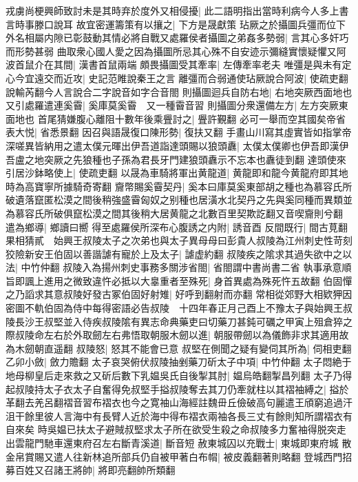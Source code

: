 戎虜尚梗興師致討未是其時弃於度外又相侵擾|{
	此二語明指出當時利病今人多上書言時事滕口說耳}
故宜密運籌策有以攘之|{
	下方是晟獻策}
玷厥之於攝圖兵彊而位下外名相屬内隙已彰鼓動其情必將自戰又處羅侯者攝圖之弟姦多勢弱|{
	言其心多奸巧而形勢甚弱}
曲取衆心國人愛之因為攝圖所忌其心殊不自安迹示彌縫實懷疑懼又阿波首鼠介在其間|{
	漢書首鼠兩端}
頗畏攝圖受其牽率|{
	左傳牽率老夫}
唯彊是與未有定心今宜遠交而近攻|{
	史記范睢說秦王之言}
離彊而合弱通使玷厥說合阿波|{
	使疏吏翻說輸芮翻今人言說合二字說音如字合音閤}
則攝圖迴兵自防右地|{
	右地突厥西面地也}
又引處羅遣連奚霫|{
	奚庫莫奚霫　又一種霫音習}
則攝圖分衆還備左方|{
	左方突厥東面地也}
首尾猜嫌腹心離阻十數年後乘舋討之|{
	舋許覲翻}
必可一舉而空其國矣帝省表大悦|{
	省悉景翻}
因召與語晟復口陳形勢|{
	復扶又翻}
手畫山川寫其虛實皆如指掌帝深嗟異皆納用之遣太僕元暉出伊吾道詣達頭賜以狼頭纛|{
	太僕太僕卿也伊吾即漢伊吾盧之地突厥之先狼種也子孫為君長牙門建狼頭纛示不忘本也纛徒到翻}
達頭使來引居沙鉢略使上|{
	使疏吏翻}
以晟為車騎將軍出黄龍道|{
	黄龍即和龍今黄龍府即其地時為高寶寧所據騎奇寄翻}
齎幣賜奚霫契丹|{
	奚本曰庫莫奚東部胡之種也為慕容氏所破遺落竄匿松漠之間後稍強盛霫匈奴之别種也居潢水北契丹之先與奚同種而異類並為慕容氏所破俱竄松漠之間其後稍大居黄龍之北數百里契欺訖翻又音喫齎則兮翻}
遣為鄉導|{
	鄉讀曰嚮}
得至處羅侯所深布心腹誘之内附|{
	誘音酉}
反間既行|{
	間古莧翻}
果相猜貳　始興王叔陵太子之次弟也與太子異母母曰彭貴人叔陵為江州刺史性苛刻狡險新安王伯固以善諧謔有寵於上及太子|{
	謔虚約翻}
叔陵疾之隂求其過失欲中之以法|{
	中竹仲翻}
叔陵入為揚州刺史事務多關涉省閤|{
	省閤謂中書尚書二省}
執事承意順旨即諷上進用之微致違忤必抵以大辠重者至殊死|{
	身首異處為殊死忤五故翻}
伯固憚之乃謟求其意叔陵好發古冢伯固好射雉|{
	好呼到翻射而亦翻}
常相從郊野大相欵狎因密圖不軌伯固為侍中每得密語必告叔陵　十四年春正月己酉上不豫太子與始興王叔陵長沙王叔堅並入侍疾叔陵隂有異志命典藥吏曰切藥刀甚鈍可礪之甲寅上殂倉猝之際叔陵命左右於外取劒左右弗悟取朝服木劒以進|{
	朝服帶劒以為儀飾非求其適用故為木劒朝直遥翻}
叔陵怒|{
	怒其不能會已意}
叔堅在側聞之疑有變伺其所為|{
	伺相吏翻}
乙卯小斂|{
	斂力贍翻}
太子哀哭俯伏叔陵抽剉藥刀斫太子中項|{
	中竹仲翻}
太子悶絶于地母柳皇后走來救之又斫后數下乳媪吳氏自後掣其肘|{
	媪烏皓翻掣昌列翻}
太子乃得起叔陵持太子衣太子自奮得免叔堅手搤叔陵奪去其刀仍牽就柱以其褶袖縛之|{
	搤於革翻去羌呂翻褶音習布褶衣也今之寛袖山海經註魏毌丘儉破高句麗遣王頎窮追過汗沮干餘里彼人言海中有長臂人近於海中得布褶衣兩袖各長三丈有餘則知所謂褶衣有自來矣}
時吳媪已扶太子避賊叔堅求太子所在欲受生殺之命叔陵多力奮袖得脱突走出雲龍門馳車還東府召左右斷青溪道|{
	斷音短}
赦東城囚以充戰士|{
	東城即東府城}
散金帛賞賜又遣人往新林追所部兵仍自被甲著白布㡌|{
	被皮義翻著則略翻}
登城西門招募百姓又召諸王將帥|{
	將即亮翻帥所類翻}
